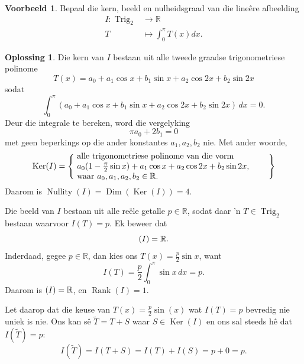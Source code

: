 \documentclass[a4paper,11pt]{book}
\theoremstyle{definition}
\newtheorem{example_environment}{Voorbeeld}[chapter]
\newtheorem*{solution}{Oplossing}
\newenvironment{example}
	{
		\begin{oframed}
		\begin{example_environment}
	}
	{
		\end{example_environment}
		\end{oframed}
	}
\DeclareMathOperator{\Trig}{Trig}
\DeclareMathOperator{\Dim}{Dim}
\DeclareMathOperator{\Ker}{Ker}
\DeclareMathOperator{\Nullity}{Nullity}
\DeclareMathOperator{\Rank}{Rank}
\let\Im\relax
\DeclareMathOperator{\Im}{Im} %
\begin{document}
\begin{example} Bepaal die kern, beeld en nulheidsgraad van die line{\^e}re
	afbeelding
	\begin{align}
		I : \Trig_2 & \rightarrow \mathbb{R} \\
		T & \mapsto \int_0^\pi T(x) dx .
	\end{align}
	\begin{solution} Die kern van $I$ bestaan uit alle tweede graadse
		trigonometriese polinome
		\[
			T(x) = a_0 + a_1 \cos x + b_1 \sin x + a_2 \cos 2x + b_2 \sin
			2x
		\]
		sodat
		\[
 \int_0^\pi (a_0 + a_1 \cos x + b_1 \sin x + a_2 \cos 2x + b_2 \sin 2x) \,
		dx = 0. 
		\] 
		Deur die integrale te bereken, word die vergelyking
		\[
			\pi a_0 + 2 b_1 = 0
		\]
		met geen beperkings op die ander konstantes $a_1, a_2, b_2$ nie.
		Met ander woorde, 
		\[
			\Ker(I) = \left\{ \mbox{
				\begin{minipage}{8cm} alle
					trigonometriese polinome van die vorm  \\ $a_0(1 -
					\frac{\pi}{2} \sin x) + a_1 \cos x + a_2 \cos{2x} + b_2
					\sin{2x}$, \\ waar $a_0, a_1, a_2, b_2 \in
					\mathbb{R}$.
				\end{minipage}
				} \right\}
		\]
		Daarom is $\Nullity(I) = \Dim (\Ker(I)) = 4$. 

		Die beeld van $I$ bestaan uit alle re{\"e}le getalle $p \in
		\mathbb{R}$, sodat daar 'n $T \in \Trig_2$ bestaan waarvoor $I(T) =
		p$. Ek beweer dat
		\[
			\Im(I) = \mathbb{R}.
		\]
		Inderdaad, gegee $p \in \mathbb{R}$, dan kies ons $T(x) =
		\frac{p}{2} \sin{x}$, want
		\[
			I(T) = \frac{p}{2} \int_0^\pi \sin{x} \, dx  = p. 
		\]
		Daarom is $\Im(I) = \mathbb{R}$, en $\Rank(I) = 1$.

		Let daarop dat die keuse van $T(x) = \frac{p}{2} \sin(x)$ wat $I(T)
		= p$ bevredig nie uniek is nie. Ons kan s{\^e} $\tilde{T} = T + S$
		waar $S \in \Ker(I)$ en ons sal steeds h{\^e} dat $I(\tilde{T})=p$:
		\[
			I(\tilde{T}) = I(T + S) = I(T) + I(S) =  p + 0 = p.
		\] 
	\end{solution}
\end{example}
\end{document}
